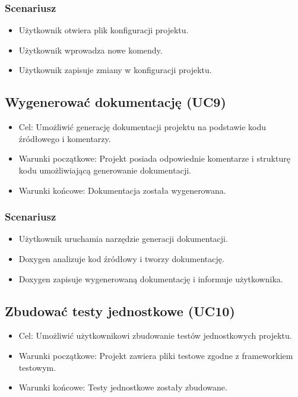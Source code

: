 \subsubsection{Scenariusz}
\begin{itemize}
    \item Użytkownik otwiera plik konfiguracji projektu.
    \item Użytkownik wprowadza nowe komendy.
    \item Użytkownik zapisuje zmiany w konfiguracji projektu.
\end{itemize}

\subsection{Wygenerować dokumentację (UC9)}
\begin{itemize}
    \item Cel: Umożliwić generację dokumentacji projektu na podstawie kodu źródłowego i komentarzy.
    \item Warunki początkowe: Projekt posiada odpowiednie komentarze i strukturę kodu umożliwiającą generowanie dokumentacji.
    \item Warunki końcowe: Dokumentacja została wygenerowana.
\end{itemize}

\subsubsection{Scenariusz}
\begin{itemize}
    \item Użytkownik uruchamia narzędzie generacji dokumentacji.
    \item Doxygen analizuje kod źródłowy i tworzy dokumentację.
    \item Doxygen zapisuje wygenerowaną dokumentację i informuje użytkownika.
\end{itemize}

\subsection{Zbudować testy jednostkowe (UC10)}
\begin{itemize}
    \item Cel: Umożliwić użytkownikowi zbudowanie testów jednostkowych projektu.
    \item Warunki początkowe: Projekt zawiera pliki testowe zgodne z frameworkiem testowym.
    \item Warunki końcowe: Testy jednostkowe zostały zbudowane.
\end{itemize}

